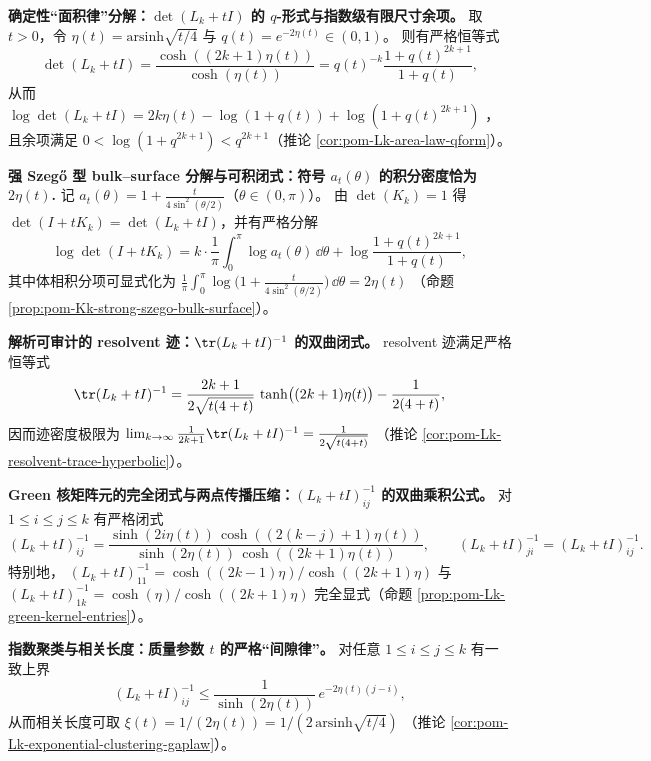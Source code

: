    \item \textbf{确定性“面积律”分解：\texorpdfstring{\(\det(L_k+tI)\)}{det(L_k+tI)} 的 \(q\)-形式与指数级有限尺寸余项。}
    取 \(t>0\)，令
    \(
    \eta(t)=\mathrm{arsinh}\sqrt{t/4}
    \)
    与 \(q(t)=e^{-2\eta(t)}\in(0,1)\)。
    则有严格恒等式
    \[
    \det(L_k+tI)=\frac{\cosh((2k+1)\eta(t))}{\cosh(\eta(t))}
    =q(t)^{-k}\frac{1+q(t)^{2k+1}}{1+q(t)},
    \]
    从而
    \(
    \log\det(L_k+tI)=2k\eta(t)-\log(1+q(t))+\log(1+q(t)^{2k+1})
    \)
    ，且余项满足 \(0<\log(1+q^{2k+1})<q^{2k+1}\)（推论 \ref{cor:pom-Lk-area-law-qform}）。

    \item \textbf{强 Szeg\H{o} 型 bulk--surface 分解与可积闭式：符号 \texorpdfstring{\(a_t(\theta)\)}{a_t(theta)} 的积分密度恰为 \texorpdfstring{\(2\eta(t)\)}{2 eta(t)}.}
    记
    \(a_t(\theta)=1+\frac{t}{4\sin^2(\theta/2)}\)（\(\theta\in(0,\pi)\)）。
    由 \(\det(K_k)=1\) 得 \(\det(I+tK_k)=\det(L_k+tI)\)，并有严格分解
    \[
    \log\det(I+tK_k)
    =k\cdot \frac{1}{\pi}\int_{0}^{\pi}\log a_t(\theta)\,\dd\theta
    +\log\frac{1+q(t)^{2k+1}}{1+q(t)},
    \]
    其中体相积分项可显式化为
    \(
    \frac{1}{\pi}\int_{0}^{\pi}\log\!\bigl(1+\frac{t}{4\sin^2(\theta/2)}\bigr)\,\dd\theta
    =2\eta(t)
    \)
    （命题 \ref{prop:pom-Kk-strong-szego-bulk-surface}）。

    \item \textbf{解析可审计的 resolvent 迹：\texorpdfstring{\(\tr(L_k+tI)^{-1}\)}{tr((L_k+tI)^{-1})} 的双曲闭式。}
    resolvent 迹满足严格恒等式
    \[
    \tr(L_k+tI)^{-1}
    =\frac{2k+1}{2\sqrt{t(4+t)}}\,\tanh\bigl((2k+1)\eta(t)\bigr)-\frac{1}{2(4+t)},
    \]
    因而迹密度极限为
    \(
    \lim_{k\to\infty}\frac{1}{2k+1}\tr(L_k+tI)^{-1}=\frac{1}{2\sqrt{t(4+t)}}
    \)
    （推论 \ref{cor:pom-Lk-resolvent-trace-hyperbolic}）。

    \item \textbf{Green 核矩阵元的完全闭式与两点传播压缩：\texorpdfstring{\((L_k+tI)^{-1}_{ij}\)}{(L_k+tI)^{-1}_{ij}} 的双曲乘积公式。}
    对 \(1\le i\le j\le k\) 有严格闭式
    \[
    (L_k+tI)^{-1}_{ij}
    =\frac{\sinh(2i\eta(t))\,\cosh((2(k-j)+1)\eta(t))}
    {\sinh(2\eta(t))\,\cosh((2k+1)\eta(t))},
    \qquad (L_k+tI)^{-1}_{ji}=(L_k+tI)^{-1}_{ij}.
    \]
    特别地，
    \(
    (L_k+tI)^{-1}_{11}=\cosh((2k-1)\eta)/\cosh((2k+1)\eta)
    \)
    与
    \(
    (L_k+tI)^{-1}_{1k}=\cosh(\eta)/\cosh((2k+1)\eta)
    \)
    完全显式（命题 \ref{prop:pom-Lk-green-kernel-entries}）。

    \item \textbf{指数聚类与相关长度：质量参数 \texorpdfstring{\(t\)}{t} 的严格“间隙律”。}
    对任意 \(1\le i\le j\le k\) 有一致上界
    \[
    (L_k+tI)^{-1}_{ij}\le \frac{1}{\sinh(2\eta(t))}\,e^{-2\eta(t)(j-i)},
    \]
    从而相关长度可取
    \(
    \xi(t)=1/(2\eta(t))=1/(2\,\mathrm{arsinh}\sqrt{t/4})
    \)
    （推论 \ref{cor:pom-Lk-exponential-clustering-gaplaw}）。


